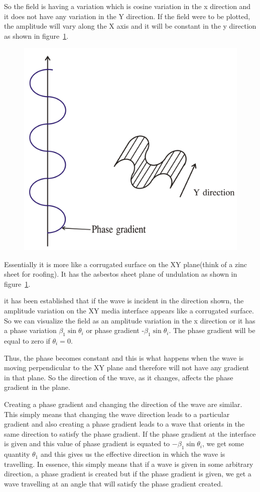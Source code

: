 So the field is having a variation which is cosine variation in the x direction and it does not have any variation in the Y direction. If the field were to be plotted, the amplitude will vary along the X axis and it will be constant in the y direction as shown in figure~\ref{fig:group30c}.
\begin{figure}[h]
\centering
\includegraphics[width=.7\linewidth]{./graphics/group30c}
\caption{}
\label{fig:group30c}
\end{figure}

Essentially it is more like a corrugated surface on the XY plane(think of a zinc sheet for roofing). It has the asbestos sheet plane of undulation as shown in figure~\ref{fig:group30c}.

it has been established that if the wave is incident in the direction shown, the amplitude variation on the XY media interface appears like a corrugated surface. So we can visualize the field as an amplitude variation in the x direction or it has a phase variation $\beta_1\sin \theta_i$ or phase gradient -$\beta_1\sin\theta_i$. The phase gradient will be equal to zero if $\theta_i=0$.

Thus, the phase becomes constant and this is what happens when the wave is moving perpendicular to the XY plane and therefore will not have any gradient in that plane. So the direction of the wave, as it changes, affects the phase gradient in the plane.

Creating a phase gradient and changing the direction of the wave are similar. This simply means that changing the wave direction leads to a particular gradient and also creating a phase gradient leads to a wave that orients in the same direction to satisfy the phase gradient. If the phase gradient at the interface is given and this value of phase gradient is equated to $-\beta_1 \sin \theta_i$, we get some quantity $\theta_1$ and this gives us the effective direction in which the wave is travelling. In essence, this simply means that if a wave is given in some arbitrary direction, a phase gradient is created but if the phase gradient is given, we get a wave travelling at an angle that will satisfy the phase gradient created.

